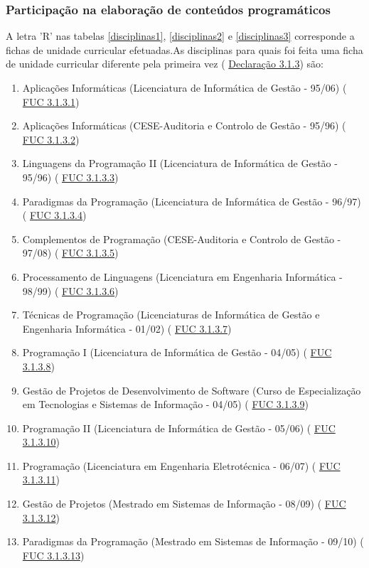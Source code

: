 \documentclass[11pt]{article}
\begin{document}
\subsubsection{Participação na elaboração de conteúdos programáticos}A letra 'R' nas tabelas 
\ref{disciplinas1},
\ref{disciplinas2} e 
\ref{disciplinas3} corresponde a fichas de unidade curricular efetuadas.As disciplinas para quais foi feita uma ficha de unidade curricular diferente pela primeira vez (
\href{run:Disciplinas/FUCs.pdf}{Declaração 3.1.3}) são:
\begin{enumerate}
\item{Aplicações Informáticas (Licenciatura de Informática de Gestão - 95/06) (
\href{run:Disciplinas/Fichas/APLICINF9596IG.pdf}{FUC 3.1.3.1})}
\item{Aplicações Informáticas (CESE-Auditoria e Controlo de Gestão - 95/96) (
\href{run:Disciplinas/Fichas/AplicInf9596.pdf}{FUC 3.1.3.2}) }
\item{Linguagens da Programação II (Licenciatura de Informática de Gestão - 95/96) (
\href{run:Disciplinas/Fichas/LPII9596.pdf}{FUC 3.1.3.3}) }
\item{Paradigmas da Programação (Licenciatura de Informática de Gestão - 96/97) (
\href{run:Disciplinas/Fichas/PP9697.pdf}{FUC 3.1.3.4})}
\item{Complementos de Programação (CESE-Auditoria e Controlo de Gestão - 97/08) (
\href{run:Disciplinas/Fichas/CP9798.pdf}{FUC 3.1.3.5}) }
\item{Processamento de Linguagens (Licenciatura em Engenharia Informática - 98/99) (
\href{run:Disciplinas/Fichas/PL9899.pdf}{FUC 3.1.3.6})}
\item{Técnicas de Programação (Licenciaturas de Informática de Gestão e Engenharia Informática - 01/02) (
\href{run:Disciplinas/Fichas/TP0102.pdf}{FUC 3.1.3.7})}
\item{Programação I (Licenciatura de Informática de Gestão - 04/05) (
\href{run:Disciplinas/Fichas/ProgI0405.pdf}{FUC 3.1.3.8}) }
\item{Gestão de Projetos de Desenvolvimento de Software (Curso de Especialização em Tecnologias e Sistemas de Informação - 04/05) (
\href{run:Disciplinas/Fichas/GPDSWCETSI0405.pdf}{FUC 3.1.3.9})}
\item{Programação II (Licenciatura de Informática de Gestão - 05/06) (
\href{run:Disciplinas/Fichas/ProgII0506.pdf}{FUC 3.1.3.10}) }
\item{Programação (Licenciatura em Engenharia Eletrotécnica - 06/07) (
\href{run:Disciplinas/Fichas/ProgEE0607.pdf}{FUC 3.1.3.11})}
\item{Gestão de Projetos (Mestrado em Sistemas de Informação - 08/09) (
\href{run:Disciplinas/Fichas/GestaoProjetos.pdf}{FUC 3.1.3.12})}
\item{Paradigmas da Programação (Mestrado em Sistemas de Informação - 09/10) (
\href{run:Disciplinas/Fichas/PP0910.pdf}{FUC 3.1.3.13})}
\end{enumerate}
\end{document}
